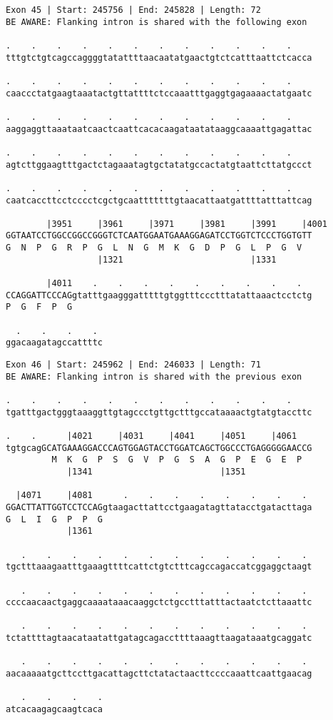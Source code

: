 \documentclass{article}
\begin{document}
\begin{Verbatim}[fontfamily=courier]
Exon 45 | Start: 245756 | End: 245828 | Length: 72
BE AWARE: Flanking intron is shared with the following exon

.    .    .    .    .    .    .    .    .    .    .    .    
tttgtctgtcagccaggggtatattttaacaatatgaactgtctcatttaattctcacca

.    .    .    .    .    .    .    .    .    .    .    .    
caaccctatgaagtaaatactgttattttctccaaatttgaggtgagaaaactatgaatc

.    .    .    .    .    .    .    .    .    .    .    .    
aaggaggttaaataatcaactcaattcacacaagataatataaggcaaaattgagattac

.    .    .    .    .    .    .    .    .    .    .    .    
agtcttggaagtttgactctagaaatagtgctatatgccactatgtaattcttatgccct

.    .    .    .    .    .    .    .    .    .    .    .    
caatcaccttcctcccctcgctgcaatttttttgtaacattaatgattttatttattcag

        |3951     |3961     |3971     |3981     |3991     |4001
GGTAATCCTGGCCGGCCGGGTCTCAATGGAATGAAAGGAGATCCTGGTCTCCCTGGTGTT
G  N  P  G  R  P  G  L  N  G  M  K  G  D  P  G  L  P  G  V  
                  |1321                         |1331       

        |4011    .    .    .    .    .    .    .    .    .  
CCAGGATTCCCAGgtatttgaagggatttttgtggtttccctttatattaaactcctctg
P  G  F  P  G                                               

  .    .    .    . 
ggacaagatagccattttc
\end{Verbatim}
\newpage
\begin{Verbatim}[fontfamily=courier]
Exon 46 | Start: 245962 | End: 246033 | Length: 71
BE AWARE: Flanking intron is shared with the previous exon

.    .    .    .    .    .    .    .    .    .    .    .    
tgatttgactgggtaaaggttgtagccctgttgctttgccataaaactgtatgtaccttc

.    .      |4021     |4031     |4041     |4051     |4061   
tgtgcagGCATGAAAGGACCCAGTGGAGTACCTGGATCAGCTGGCCCTGAGGGGGAACCG
         M  K  G  P  S  G  V  P  G  S  A  G  P  E  G  E  P  
            |1341                         |1351             

  |4071     |4081      .    .    .    .    .    .    .    . 
GGACTTATTGGTCCTCCAGgtaagacttattcctgaagatagttatacctgatacttaga
G  L  I  G  P  P  G                                         
            |1361                                           

   .    .    .    .    .    .    .    .    .    .    .    . 
tgctttaaagaatttgaaagttttcattctgtctttcagccagaccatcggaggctaagt

   .    .    .    .    .    .    .    .    .    .    .    . 
ccccaacaactgaggcaaaataaacaaggctctgcctttatttactaatctcttaaattc

   .    .    .    .    .    .    .    .    .    .    .    . 
tctattttagtaacataatattgatagcagaccttttaaagttaagataaatgcaggatc

   .    .    .    .    .    .    .    .    .    .    .    . 
aacaaaaatgcttccttgacattagcttctatactaacttccccaaattcaattgaacag

   .    .    .    .
atcacaagagcaagtcaca
\end{Verbatim}
\end{document}
